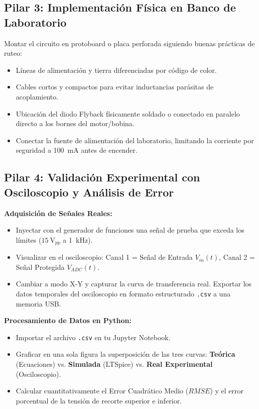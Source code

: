 \documentclass[11pt, a4paper]{article}
\begin{document}
\subsection*{Pilar 3: Implementación Física en Banco de Laboratorio}
Montar el circuito en protoboard o placa perforada siguiendo buenas prácticas de ruteo:
\begin{itemize}
    \item Líneas de alimentación y tierra diferenciadas por código de color.
    \item Cables cortos y compactos para evitar inductancias parásitas de acoplamiento.
    \item Ubicación del diodo Flyback físicamente soldado o conectado en paralelo directo a los bornes del motor/bobina.
    \item Conectar la fuente de alimentación del laboratorio, limitando la corriente por seguridad a \qty{100}{\milli\ampere} antes de encender.
\end{itemize}

\subsection*{Pilar 4: Validación Experimental con Osciloscopio y Análisis de Error}
\textbf{Adquisición de Señales Reales:}
\begin{itemize}
    \item Inyectar con el generador de funciones una señal de prueba que exceda los límites ($\qty{15}{\volt_{pp}}$ a \qty{1}{\kilo\hertz}).
    \item Visualizar en el osciloscopio: Canal 1 = Señal de Entrada $V_{in}(t)$, Canal 2 = Señal Protegida $V_{ADC}(t)$.
    \item Cambiar a modo X-Y y capturar la curva de transferencia real. Exportar los datos temporales del osciloscopio en formato estructurado \texttt{.csv} a una memoria USB.
\end{itemize}
\textbf{Procesamiento de Datos en Python:}
\begin{itemize}
    \item Importar el archivo \texttt{.csv} en tu Jupyter Notebook.
    \item Graficar en una sola figura la superposición de las tres curvas: \textbf{Teórica} (Ecuaciones) vs. \textbf{Simulada} (LTSpice) vs. \textbf{Real Experimental} (Osciloscopio).
    \item Calcular cuantitativamente el Error Cuadrático Medio ($RMSE$) y el error porcentual de la tensión de recorte superior e inferior.
\end{itemize}
\end{document}
